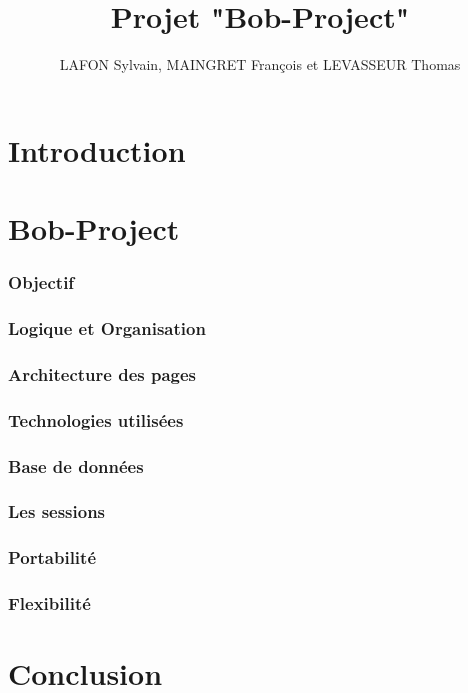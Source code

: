 \documentclass[10pt,a4paper]{article}
\author{LAFON Sylvain, MAINGRET François et LEVASSEUR Thomas}
\title{Projet "Bob-Project"}
\begin{document}
\maketitle
\tableofcontents
\newpage
	\part{Introduction}
		
	
	\part{Bob-Project}
		\section{Objectif}
		\section{Logique et Organisation}
		\section{Architecture des pages}
		\section{Technologies utilisées}
		\section{Base de données}
		\section{Les sessions}
		\section{Portabilité}
		\section{Flexibilité} %
		
	\part{Conclusion}
\end{document}
